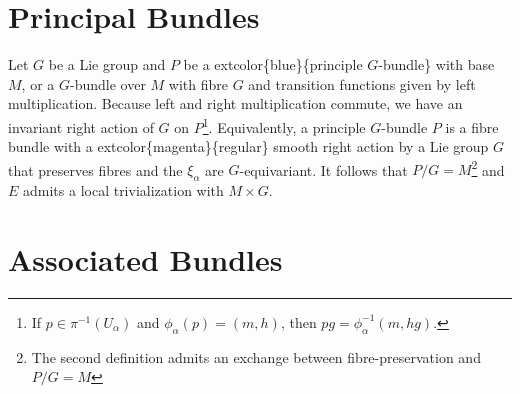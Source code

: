 \documentclass[
]{book}
\begin{document}
\hypertarget{principal-bundles}{%
\section{Principal Bundles}\label{principal-bundles}}

Let \(G\) be a Lie group and \(P\) be a extcolor\{blue\}\{principle \(G\)-bundle\} with base \(M\), or a \(G\)-bundle over \(M\) with fibre \(G\) and transition functions given by left multiplication. Because left and right multiplication commute, we have an invariant right action of \(G\) on \(P\)\footnote{If \(p \in \pi^{-1}(U_\alpha)\) and \(\phi_\alpha(p) = (m,h)\), then \(pg = \phi_\alpha^{-1}(m,hg)\).}. Equivalently, a principle \(G\)-bundle \(P\) is a fibre bundle with a extcolor\{magenta\}\{regular\} smooth right action by a Lie group \(G\) that preserves fibres and the \(\xi_\alpha\) are \(G\)-equivariant. It follows that \(P/G = M\)\footnote{The second definition admits an exchange between fibre-preservation and \(P/G = M\)} and \(E\) admits a local trivialization with \(M \times G\).

\hypertarget{associated-bundles}{%
\section{Associated Bundles}\label{associated-bundles}}
\end{document}
